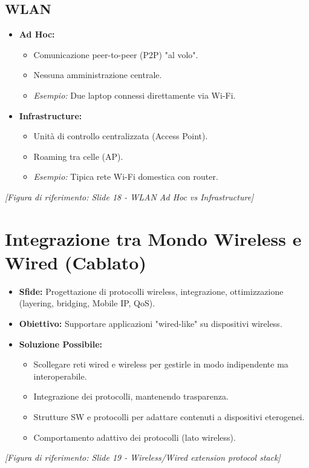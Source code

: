 \subsection{WLAN}
\begin{itemize}
    \item \textbf{Ad Hoc:}
    \begin{itemize}
        \item Comunicazione peer-to-peer (P2P) "al volo".
        \item Nessuna amministrazione centrale.
        \item \textit{Esempio:} Due laptop connessi direttamente via Wi-Fi.
    \end{itemize}
    \item \textbf{Infrastructure:}
    \begin{itemize}
        \item Unità di controllo centralizzata (Access Point).
        \item Roaming tra celle (AP).
        \item \textit{Esempio:} Tipica rete Wi-Fi domestica con router.
    \end{itemize}
\end{itemize}
\textit{[Figura di riferimento: Slide 18 - WLAN Ad Hoc vs Infrastructure]}

\section{Integrazione tra Mondo Wireless e Wired (Cablato)}
\begin{itemize}
    \item \textbf{Sfide:} Progettazione di protocolli wireless, integrazione, ottimizzazione (layering, bridging, Mobile IP, QoS).
    \item \textbf{Obiettivo:} Supportare applicazioni "wired-like" su dispositivi wireless.
    \item \textbf{Soluzione Possibile:}
    \begin{itemize}
        \item Scollegare reti wired e wireless per gestirle in modo indipendente ma interoperabile.
        \item Integrazione dei protocolli, mantenendo trasparenza.
        \item Strutture SW e protocolli per adattare contenuti a dispositivi eterogenei.
        \item Comportamento adattivo dei protocolli (lato wireless).
    \end{itemize}
\end{itemize}
\textit{[Figura di riferimento: Slide 19 - Wireless/Wired extension protocol stack]}

